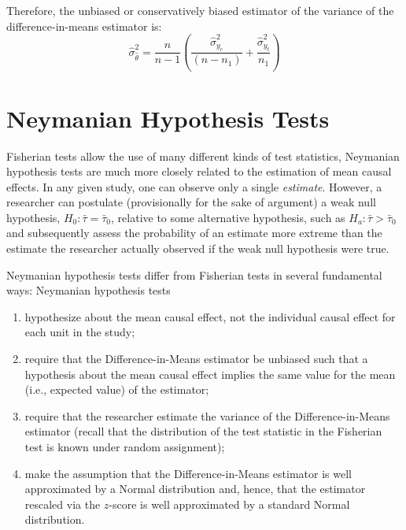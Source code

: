 \documentclass[12pt,leqno]{article}
\theoremstyle{newstyle}
\begin{document}
Therefore, the unbiased or conservatively biased estimator of the
variance of the difference-in-means estimator is: \begin{equation*}
\widehat{\sigma}^2_{\hat{\theta}} = \frac{n}{n - 1}\left(\frac{\widehat{\sigma}^2_{y_c}}{\left(n - n_1\right)} + \frac{\widehat{\sigma}^2_{y_t}}{n_1} \right)
\end{equation*}

\section{Neymanian Hypothesis Tests}

Fisherian tests allow the use of many different kinds of test
statistics, Neymanian hypothesis tests are much more closely related to
the estimation of mean causal effects. In any given study, one can
observe only a single \textit{estimate}. However, a researcher can
postulate (provisionally for the sake of argument) a weak null
hypothesis, \(H_0: \bar{\tau} = \bar{\tau}_0\), relative to some
alternative hypothesis, such as \(H_a: \bar{\tau} > \bar{\tau}_0\) and
subsequently assess the probability of an estimate more extreme than the
estimate the researcher actually observed if the weak null hypothesis
were true.

Neymanian hypothesis tests differ from Fisherian tests in several
fundamental ways: Neymanian hypothesis tests

\begin{enumerate}
\item hypothesize about the mean causal effect, not the individual causal effect for each unit in the study; 
\item require that the Difference-in-Means estimator be unbiased such that a hypothesis about the mean causal effect implies the same value for the mean (i.e., expected value) of the estimator; 
\item require that the researcher estimate the variance of the Difference-in-Means estimator (recall that the distribution of the test statistic in the Fisherian test is known under random assignment); 
\item make the assumption that the Difference-in-Means estimator is well approximated by a Normal distribution and, hence, that the estimator rescaled via the $z$-score is well approximated by a standard Normal distribution.
\end{enumerate}
\end{document}
